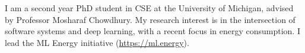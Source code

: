 

\begin{cvparagraph}

I am a second year PhD student in CSE at the University of Michigan, advised by Professor Mosharaf Chowdhury.
My research interest is in the intersection of software systems and deep learning, with a recent focus in energy consumption.
I lead the ML Energy initiative (\url{https://ml.energy}).
\end{cvparagraph}
